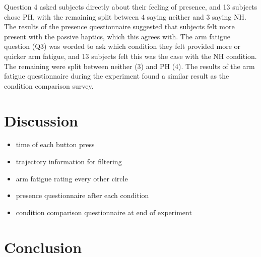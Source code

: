 Question 4 asked subjects directly about their feeling of presence, and 13 subjects chose PH, with the remaining split between 4 saying neither and 3 saying NH.
The results of the presence questionnaire suggested that subjects felt more present with the passive haptics, which this agrees with.
The arm fatigue question (Q3) was worded to ask which condition they felt provided more or quicker arm fatigue, and 13 subjects felt this was the case with the NH condition.
The remaining were split between neither (3) and PH (4).
The results of the arm fatigue questionnaire during the experiment found a similar result as the condition comparison survey.

\section{Discussion}

\begin{itemize}
  \item time of each button press
  \item trajectory information for filtering
  \item arm fatigue rating every other circle
  \item presence questionnaire after each condition
  \item condition comparison questionnaire at end of experiment
\end{itemize}

\section{Conclusion}


